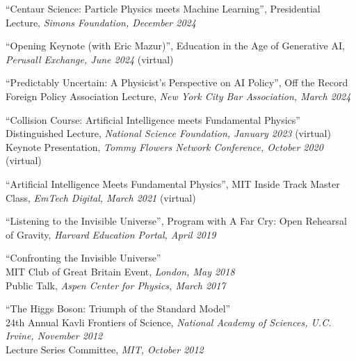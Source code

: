 \bbl

\item ``Centaur Science:  Particle Physics meets Machine Learning'', Presidential Lecture, \emph{Simons Foundation, December 2024}

\item ``Opening Keynote (with Eric Mazur)'', Education in the Age of Generative AI, \emph{Perusall Exchange, June 2024} (virtual)

\item ``Predictably Uncertain: A Physicist’s Perspective on AI Policy'', Off the Record Foreign Policy Association Lecture, \emph{New York City Bar Association, March 2024}

\item ``Collision Course: Artificial Intelligence meets Fundamental Physics''
\\ Distinguished Lecture, \emph{National Science Foundation, January 2023} (virtual)
\\ Keynote Presentation, \emph{Tommy Flowers Network Conference, October 2020} (virtual)

\item ``Artificial Intelligence Meets Fundamental Physics'', MIT Inside Track Master Class, \emph{EmTech Digital, March 2021} (virtual)

\item ``Listening to the Invisible Universe'', Program with A Far Cry: Open Rehearsal of Gravity, \emph{Harvard Education Portal, April 2019}

\item ``Confronting the Invisible Universe''
\\ MIT Club of Great Britain Event, \emph{London, May 2018}
\\ Public Talk, \emph{Aspen Center for Physics, March 2017}

\item ``The Higgs Boson:  Triumph of the Standard Model''
\\ 24th Annual Kavli Frontiers of Science, \emph{National Academy of Sciences, U.C. Irvine, November 2012}
\\ Lecture Series Committee, \emph{MIT, October 2012}

\el
